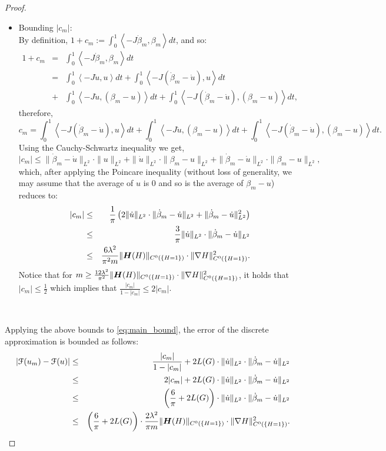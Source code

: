 \documentclass[../capacities_main.tex]{subfiles}
\begin{document}
\begin{proof}
\begin{itemize}
	\item Bounding {$|c_m|$}:\\
		By definition, $1+c_m:=\int_0^1 \left<-J\dot\beta_m,\beta_m\right>dt$, and so:
	 	\begin{eqnarray*}
	 	1+c_m &=& \int_0^1 \left<-J\dot\beta_m,\beta_m\right>dt \\
	 	&=& \int_0^1 \left<-J\dot u,u\right>dt + \int_0^1 \left<-J(\dot\beta_m-\dot u),u\right>dt\\
	 	&+& \int_0^1 \left<-J\dot u,(\beta_m-u)\right>dt + \int_0^1 \left<-J(\dot\beta_m-\dot u),(\beta_m-u)\right>dt,
	 	\end{eqnarray*}
	 	therefore,
	 	\[
	 	c_m = \int_0^1 \left<-J(\dot\beta_m-\dot u),u\right>dt + \int_0^1 \left<-J\dot u,(\beta_m-u)\right>dt + \int_0^1 \left<-J(\dot\beta_m-\dot u),(\beta_m-u)\right>dt.
	 	\]
	 	Using the Cauchy-Schwartz inequality we get,
	 	\[
	 	|c_m| \leq \|\dot\beta_m-\dot u\|_{L^2} \cdot \|u\|_{L^2} + \|\dot u\|_{L^2}\cdot \|\beta_m-u\|_{L^2} + \|\dot\beta_m-\dot u\|_{L^2}\cdot \|\beta_m-u\|_{L^2},
	 	\]
	 	which, after applying the Poincare inequality (without loss of generality, we may assume that the average of $u$ is 0 and so is the average of $\beta_m-u$) reduces to:
	 	\begin{eqnarray*}
	 	|c_m| &\leq& \frac{1}{\pi} \left(2 \|\dot u\|_{L^2}\cdot \|\dot\beta_m-\dot u\|_{L^2} + \|\dot\beta_m-\dot u\|_{L^2}^2\right)\\
	 	&\leq& \frac{3}{\pi} \|\dot u\|_{L^2}\cdot \|\dot\beta_m-\dot u\|_{L^2}\\
	 	&\leq& \frac{6\lambda^2}{\pi^2 m}\|\boldsymbol{H} (H)\|_{C^0(\{H=1\})}\cdot \|\nabla H\|^2_{C^0(\{H=1\})}.
	 	\end{eqnarray*}
	 	Notice that for $m\geq\frac{12\lambda^2}{\pi^2 }\|\boldsymbol{H} (H)\|_{C^0(\{H=1\})}\cdot \|\nabla H\|^2_{C^0(\{H=1\})} $, it holds that $|c_m|\leq \frac{1}{2}$ which implies that $\frac{|c_m|}{1-|c_m|}\leq 2|c_m|$.

	 \end{itemize}\

	
	Applying the above bounds to \autoref{eq:main_bound}, the error of the discrete approximation is bounded as follows:
	\begin{eqnarray*}
	|{\mathcal F}(u_m)-{\mathcal F}(u)| &\leq& \frac{|c_m|}{1-|c_m|} + 2 L(G) \cdot \|\dot u\|_{L^2}\cdot \|\dot \beta_m - \dot u\|_{L^2}\\ 
	&\leq& 2|c_m| + 2 L(G) \cdot \|\dot u\|_{L^2}\cdot \|\dot \beta_m - \dot u\|_{L^2}\\ 
	&\leq& \left(\frac{6}{\pi}  +2 L(G)\right) \cdot \|\dot u\|_{L^2}\cdot \|\dot \beta_m - \dot u\|_{L^2}\\
	&\leq& \left(\frac{6}{\pi}  +2 L(G)\right) \cdot \frac{2\lambda^2}{\pi m}\|\boldsymbol{H} (H)\|_{C^0(\{H=1\})}\cdot \|\nabla H\|^2_{C^0(\{H=1\})}.
	\end{eqnarray*}
	
\end{proof}\
\end{document}
